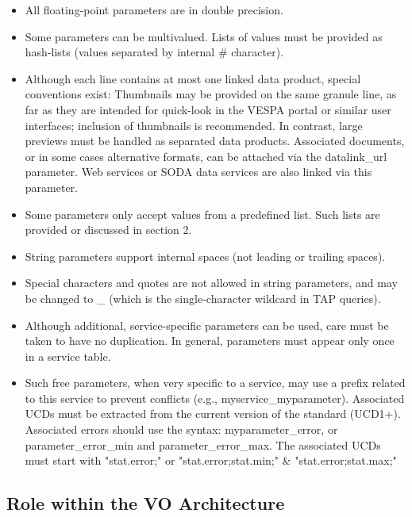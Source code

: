 \documentclass[11pt,a4paper]{ivoa}
\begin{document}
\begin{itemize}
\begin{itemize}
\item All floating-point parameters are in double precision.

\item Some parameters can be multivalued. Lists of values must be provided as hash-lists (values separated by internal \# character).

\item Although each line contains at most one linked data product, special conventions exist: 
Thumbnails may be provided on the same granule line, as far as they are intended for quick-look in the VESPA portal or similar user interfaces; inclusion of thumbnails is recommended. In contrast, large previews must be handled as separated data products.
Associated documents, or in some cases alternative formats, can be attached via the datalink\_url parameter. Web services or SODA data services are also linked via this parameter.

\item Some parameters only accept values from a predefined list. Such lists are provided or discussed in section 2.

\item String parameters support internal spaces (not leading or trailing spaces).

\item Special characters and quotes are not allowed in string parameters, and may be changed to \_ (which is the single-character wildcard in TAP queries). 

\item Although additional, service-specific parameters can be used, care must be taken to have no duplication. In general, parameters must appear only once in a service table.

\item Such free parameters, when very specific to a service, may use a prefix related to this service to prevent conflicts (e.g., myservice\_myparameter). Associated UCDs must be extracted from the current version of the standard (UCD1+).
Associated errors should use the syntax: myparameter\_error, or parameter\_error\_min and parameter\_error\_max. The associated UCDs must start with "stat.error;" or "stat.error;stat.min;" \& "stat.error;stat.max;"

\end{itemize}
\end{itemize}



\subsection{Role within the VO Architecture}
\end{document}
